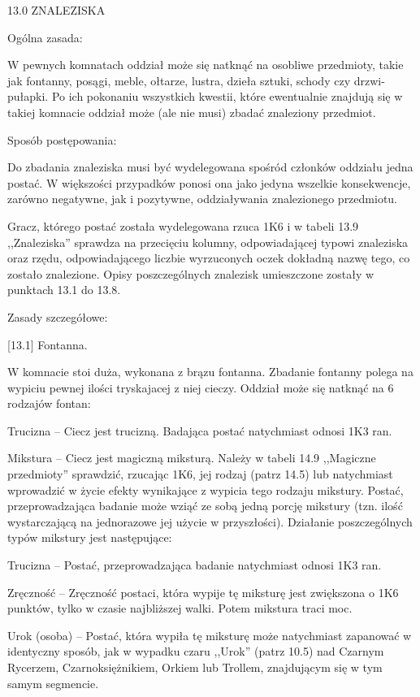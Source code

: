 13.0 ZNALEZISKA

Ogólna zasada:

W pewnych komnatach oddział może się natknąć na osobliwe przedmioty, takie jak fontanny, posągi, meble, ołtarze, lustra, dzieła sztuki, schody czy drzwi-pułapki.
Po ich pokonaniu wszystkich kwestii, które ewentualnie znajdują się w takiej komnacie oddział może (ale nie musi) zbadać znaleziony przedmiot.

Sposób postępowania:

Do zbadania znaleziska musi być wydelegowana spośród członków oddziału jedna postać.
W większości przypadków ponosi ona jako jedyna wszelkie konsekwencje, zarówno negatywne, jak i pozytywne, oddziaływania znalezionego przedmiotu.

Gracz, którego postać została wydelegowana rzuca 1K6 i w tabeli 13.9 ,,Znaleziska'' sprawdza na przecięciu kolumny, odpowiadającej typowi znaleziska oraz rzędu, odpowiadającego liczbie wyrzuconych oczek dokładną nazwę tego, co zostało znalezione.
Opisy poszczególnych znalezisk umieszczone zostały w punktach 13.1 do 13.8.

Zasady szczegółowe:

[13.1] Fontanna.

W komnacie stoi duża, wykonana z brązu fontanna.
Zbadanie fontanny polega na wypiciu pewnej ilości tryskajacej z niej cieczy.
Oddział może się natknąć na 6 rodzajów fontan:

Trucizna – Ciecz jest trucizną.
Badająca postać natychmiast odnosi 1K3 ran.

Mikstura – Ciecz jest magiczną miksturą.
Należy w tabeli 14.9 ,,Magiczne przedmioty'' sprawdzić, rzucając 1K6, jej rodzaj (patrz 14.5) lub natychmiast wprowadzić w życie efekty wynikające z wypicia tego rodzaju mikstury.
Postać, przeprowadzająca badanie może wziąć ze sobą jedną porcję mikstury (tzn. ilość wystarczającą na jednorazowe jej użycie w przyszłości).
Działanie poszczególnych typów mikstury jest następujące:

Trucizna – Postać, przeprowadzająca badanie natychmiast odnosi 1K3 ran.

Zręczność – Zręczność postaci, która wypije tę miksturę jest zwiększona o 1K6 punktów, tylko w czasie najbliższej walki.
Potem mikstura traci moc.

Urok (osoba) – Postać, która wypiła tę miksturę może natychmiast zapanować w identyczny sposób, jak w wypadku czaru ,,Urok'' (patrz 10.5) nad Czarnym Rycerzem, Czarnoksiężnikiem, Orkiem lub Trollem, znajdującym się w tym samym segmencie.

